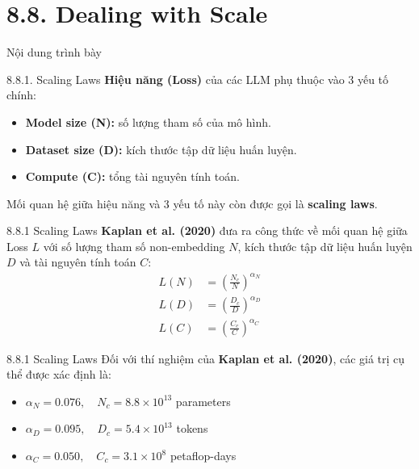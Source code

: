 \section{8.8. Dealing with Scale}

\begin{frame}{Nội dung trình bày}
	\tableofcontents[currentsection]
\end{frame}

\begin{frame}{8.8.1. Scaling Laws}
	\textbf{Hiệu năng (Loss)} của các LLM phụ thuộc vào 3 yếu tố chính:
			\begin{itemize}
				\item \textbf{Model size (N):} số lượng tham số của mô hình.
				\item \textbf{Dataset size (D):} kích thước tập dữ liệu huấn luyện.
				\item \textbf{Compute (C):} tổng tài nguyên tính toán.
			\end{itemize}
	\vspace{0.4cm}
	Mối quan hệ giữa hiệu năng và 3 yếu tố này còn được gọi là \textbf{scaling laws}.

\end{frame}

\begin{frame}{8.8.1 Scaling Laws}
	\textbf{Kaplan et al. (2020)} đưa ra công thức về mối quan hệ giữa Loss $L$ với số lượng tham số non-embedding $N$, kích thước tập dữ liệu huấn luyện $D$ và tài nguyên tính toán $C$:
	\begin{align*}
		L(N) &= \left( \frac{N_c}{N} \right)^{\alpha_N} \tag{8.49} \\[10pt]
		L(D) &= \left( \frac{D_c}{D} \right)^{\alpha_D} \tag{8.50} \\[10pt]
		L(C) &= \left( \frac{C_c}{C} \right)^{\alpha_C} \tag{8.51}
	\end{align*}
\end{frame}

\begin{frame}{8.8.1 Scaling Laws}
Đối với thí nghiệm của \textbf{Kaplan et al. (2020)}, các giá trị cụ thể được xác định là:

\begin{itemize}
	\item $\alpha_N = 0.076,\quad N_c = 8.8 \times 10^{13}$ parameters
	\item $\alpha_D = 0.095,\quad D_c = 5.4 \times 10^{13}$ tokens
	\item $\alpha_C = 0.050,\quad C_c = 3.1 \times 10^{8}$ petaflop-days
\end{itemize}

\vspace{0.3cm}



\end{frame}

